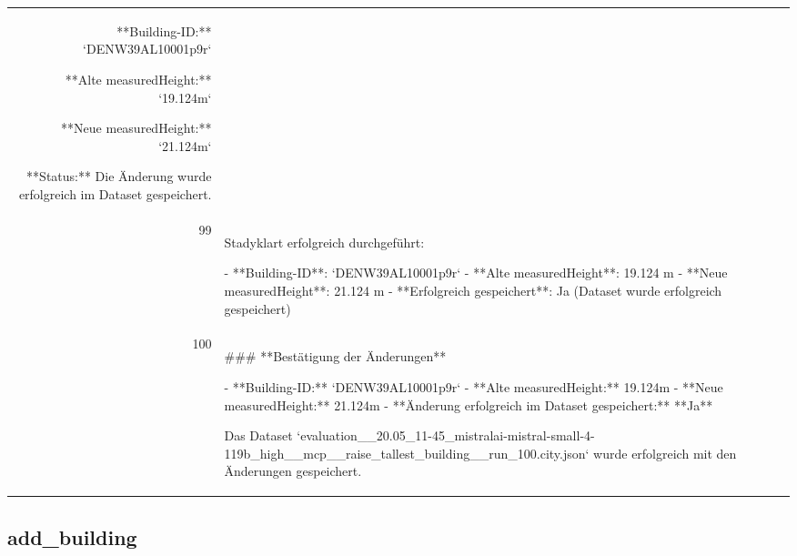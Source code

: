 \documentclass[a4paper,11pt]{article}
\begin{document}
\begin{table}[ht]
\begin{tabular}{r p{12cm}}
**Building-ID:** `DENW39AL10001p9r`

**Alte measuredHeight:** `19.124m`

**Neue measuredHeight:** `21.124m`

**Status:** Die Änderung wurde erfolgreich im Dataset gespeichert. \\
99 &  Stadyklart erfolgreich durchgeführt:

- **Building-ID**: `DENW39AL10001p9r`
- **Alte measuredHeight**: 19.124 m
- **Neue measuredHeight**: 21.124 m
- **Erfolgreich gespeichert**: Ja (Dataset wurde erfolgreich gespeichert) \\
100 & \#\#\# **Bestätigung der Änderungen**

- **Building-ID:** `DENW39AL10001p9r`
- **Alte measuredHeight:** 19.124m
- **Neue measuredHeight:** 21.124m
- **Änderung erfolgreich im Dataset gespeichert:** **Ja**

Das Dataset `evaluation\_\_20.05\_11-45\_mistralai-mistral-small-4-119b\_high\_\_mcp\_\_raise\_tallest\_building\_\_run\_100.city.json` wurde erfolgreich mit den Änderungen gespeichert. \\
\hline
\end{tabular}
\end{table}

\clearpage
\subsection{add\_building}
\end{document}
